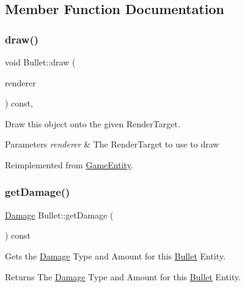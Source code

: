 \subsection{Member Function Documentation}
\mbox{\label{class_bullet_a5b245a34c66d03693318a801703d76eb}} 
\subsubsection{\texorpdfstring{draw()}{draw()}}
{\footnotesize\ttfamily void Bullet\+::draw (\begin{DoxyParamCaption}\item[{\mbox{\hyperlink{classsf_1_1_render_target}{sf\+::\+Render\+Target}} \&}]{renderer }\end{DoxyParamCaption}) const\hspace{0.3cm}{\ttfamily [override]}, {\ttfamily [virtual]}}



Draw this object onto the given Render\+Target. 


\begin{DoxyParams}{Parameters}
{\em renderer} & The Render\+Target to use to draw \\
\hline
\end{DoxyParams}


Reimplemented from \mbox{\hyperlink{class_game_entity_ae8417c4fa668594827706c44091f7366}{Game\+Entity}}.

\mbox{\label{class_bullet_a4840cd10b4da464618f2b4b256a6f744}} 
\subsubsection{\texorpdfstring{getDamage()}{getDamage()}}
{\footnotesize\ttfamily \mbox{\hyperlink{struct_damage}{Damage}} Bullet\+::get\+Damage (\begin{DoxyParamCaption}{ }\end{DoxyParamCaption}) const}



Gets the \mbox{\hyperlink{struct_damage}{Damage}} Type and Amount for this \mbox{\hyperlink{class_bullet}{Bullet}} Entity. 

\begin{DoxyReturn}{Returns}
The \mbox{\hyperlink{struct_damage}{Damage}} Type and Amount for this \mbox{\hyperlink{class_bullet}{Bullet}} Entity. 
\end{DoxyReturn}
\mbox{\label{class_bullet_abda4abdf149369188eb7cf7768ef2e56}} 
